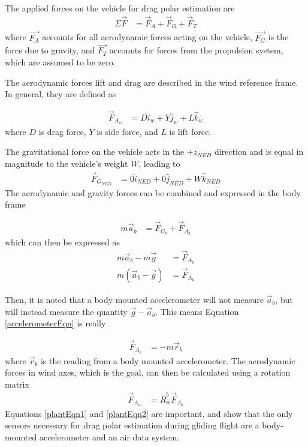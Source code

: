 The applied forces on the vehicle for drag polar estimation are 
\begin{align}
\Sigma\vec{F} &= \vec{F}_{A}+\vec{F}_{G}+\vec{F}_{T}
\end{align}
\noindent
where $\vec{F_{A}}$ accounts for all aerodynamic forces acting on the vehicle, $\vec{F_{G}}$ is the force due to gravity, and $\vec{F_{T}}$ accounts for forces from the propulsion system, which are assumed to be zero.

The aerodynamic forces lift and drag are described in the wind reference frame. In general, they are defined as

\begin{align}
\vec{F}_{A_w} &= D \hat{i}_w+Y \hat{j}_w+L \hat{k}_w
\end{align}
\noindent
where $D$ is drag force, $Y$ is side force, and $L$ is lift force.

The gravitational force on the vehicle acts in the $+z_{NED}$ direction and is equal in magnitude to the vehicle's weight $W$, leading to
\begin{align}
\vec{F}_{G_{NED}} &= 0\hat{i}_{NED}+0\hat{j}_{NED}+W\hat{k}_{NED}
\end{align}
The aerodynamic and gravity forces can be combined and expressed in the body frame

\begin{align}
m\vec{a}_b &= \vec{F}_{G_b} + \vec{F}_{A_b}
\end{align}
\noindent
which can then be expressed as 
\begin{align}
m\vec{a}_b - m\vec{g} &= \vec{F}_{A_b}\\
m(\vec{a}_b - \vec{g}) &= \vec{F}_{A_b}
\label{accelerometerEqn}
\end{align}

Then, it is noted that a body mounted accelerometer will not measure $\vec{a}_b$, but will instead measure the quantity $\vec{g} - \vec{a}_b$. This means Equation \ref{accelerometerEqn} is really

\begin{align}
\label{plantEqn1}
\vec{F}_{A_b} &= -m\vec{r}_b
\end{align}
where $\vec{r}_b$ is the reading from a body mounted accelerometer. The aerodynamic forces in wind axes, which is the goal, can then be calculated using a rotation matrix
\begin{align}
\label{plantEqn2}
\vec{F}_{A_w} &= \bar{R}^b_w\vec{F}_{A_b}
\end{align}
Equations \ref{plantEqn1} and \ref{plantEqn2} are important, and show that the only sensors necessary for drag polar estimation during gliding flight are a body-mounted accelerometer and an air data system.

